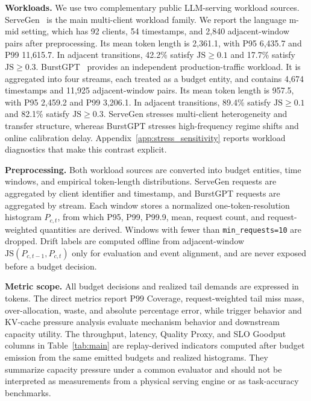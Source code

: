\documentclass[sigplan,10pt, anonymous]{acmart}
\begin{document}
\textbf{Workloads.} We use two complementary public LLM-serving workload sources. ServeGen~\cite{Xiang2026NSDI} is the main multi-client workload family. We report the language m-mid setting, which has 92 clients, 54 timestamps, and 2,840 adjacent-window pairs after preprocessing. Its mean token length is 2,361.1, with P95 6,435.7 and P99 11,615.7. In adjacent transitions, 42.2\% satisfy $\mathrm{JS}\ge0.1$ and 17.7\% satisfy $\mathrm{JS}\ge0.3$. BurstGPT~\cite{Wang2025KDD} provides an independent production-traffic workload. It is aggregated into four streams, each treated as a budget entity, and contains 4,674 timestamps and 11,925 adjacent-window pairs. Its mean token length is 957.5, with P95 2,459.2 and P99 3,206.1. In adjacent transitions, 89.4\% satisfy $\mathrm{JS}\ge0.1$ and 82.1\% satisfy $\mathrm{JS}\ge0.3$. ServeGen stresses multi-client heterogeneity and transfer structure, whereas BurstGPT stresses high-frequency regime shifts and online calibration delay. Appendix~\ref{app:stress_sensitivity} reports workload diagnostics that make this contrast explicit.

\textbf{Preprocessing.} Both workload sources are converted into budget entities, time windows, and empirical token-length distributions. ServeGen requests are aggregated by client identifier and timestamp, and BurstGPT requests are aggregated by stream. Each window stores a normalized one-token-resolution histogram $P_{c,t}$, from which P95, P99, P99.9, mean, request count, and request-weighted quantities are derived. Windows with fewer than \texttt{min\_requests=10} are dropped. Drift labels are computed offline from adjacent-window $\mathrm{JS}(P_{c,t-1},P_{c,t})$ only for evaluation and event alignment, and are never exposed before a budget decision.




\textbf{Metric scope.} All budget decisions and realized tail demands are expressed in tokens. The direct metrics report P99 Coverage, request-weighted tail miss mass, over-allocation, waste, and absolute percentage error, while trigger behavior and KV-cache pressure analysis evaluate mechanism behavior and downstream capacity utility. The throughput, latency, Quality Proxy, and SLO Goodput columns in Table~\ref{tab:main} are replay-derived indicators computed after budget emission from the same emitted budgets and realized histograms. They summarize capacity pressure under a common evaluator and should not be interpreted as measurements from a physical serving engine or as task-accuracy benchmarks.
\end{document}

